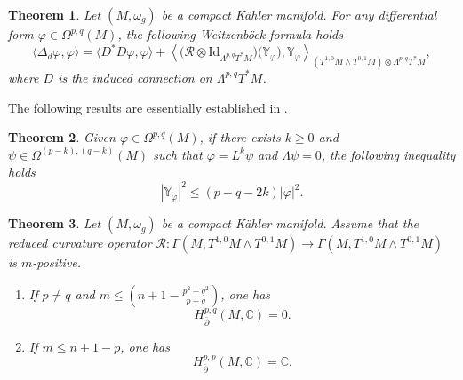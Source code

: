 \documentclass[12pt, reqno]{amsart}
\theoremstyle{plain}
\newtheorem{thm}{Theorem}[section]
\theoremstyle{definition}
\newcommand{\btheorem}{\begin{thm}}
\newcommand{\etheorem}{\end{thm}}
\newcommand{\p}{\partial}
\renewcommand{\bar}{\overline}
\renewcommand{\phi}{\varphi}
\newcommand{\beq}{\begin{equation}}
\newcommand{\eeq}{\end{equation}}
\newcommand{\bd}{\begin{enumerate}}
\newcommand{\ed}{\end{enumerate}}
\renewcommand{\>}{\rightarrow}
\renewcommand{\#}{\sharp}
\numberwithin{equation}{section} %
\begin{document}
\btheorem Let $(M,\omega_g)$ be a compact K\"ahler manifold. For any differential form $ \phi \in \Omega^{p,q}(M) $, the following Weitzenb\"ock formula  holds
\beq \langle\Delta_d \phi, \phi\rangle = \langle D^*D\phi, \phi\rangle + \left\langle \big(\mathscr{R}\otimes \mathrm{Id}_{\Lambda^{p,q}T^*M}\big)\big(\mathbb Y_\phi\big),\mathbb Y_\phi \right\rangle_{\left(T^{1,0}M \wedge T^{0,1}M\right) \otimes \Lambda^{p,q}T^*M }, \eeq
where $ D $ is the induced connection on $ \Lambda^{p,q}T^*M $.
\etheorem


\noindent The following results are essentially established in  \cite{PetersenWink2021b}.
\btheorem
Given  $ \phi \in \Omega^{p,q}(M) $, if there exists $ k \geq 0 $ and $ \psi \in \Omega^{(p-k),(q-k)}(M)$ such that $ \phi = L^k \psi $ and $ \Lambda \psi = 0 $, the following inequality holds
\beq |\mathbb{Y}_\phi|^2 \leq (p+q-2k)|\phi|^2. \eeq

\etheorem


\btheorem Let $(M,\omega_g)$ be a compact K\"ahler manifold. Assume that the reduced curvature operator $ \mathscr{R}: \Gamma(M,T^{1,0}M \wedge T^{0,1}M) \> \Gamma(M,T^{1,0}M \wedge T^{0,1}M) $ is $m$-positive.
\bd
\item If $ p \neq q $ and $ m \leq \left(n+1 - \frac{p^2+q^2}{p+q}\right) $, one has
\beq H^{p,q}_{\bar \p}(M,\mathbb{C}) = 0. \eeq
\item If $ m \leq n+1-p $, one has
\beq H^{p,p}_{\bar \p}(M,\mathbb{C}) = \mathbb{C}. \eeq
\ed
\etheorem



\baselineskip
\end{document}
